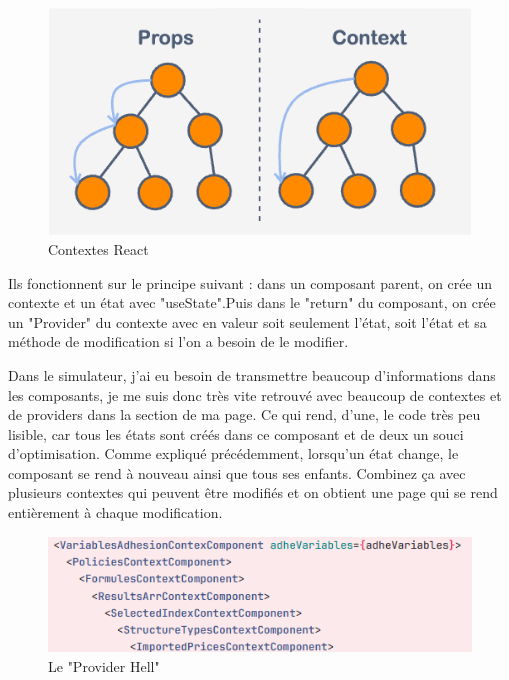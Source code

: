 \documentclass[a4paper,12pt]{report}
\begin{document}
\begin{figure}[H]
    \centering
    \includegraphics[scale=0.4]{props+vs+context.png}
    \caption{Contextes React}
    \label{fig:context-react}
\end{figure}

Ils fonctionnent sur le principe suivant : dans un composant parent, on crée un contexte et un état avec "useState".Puis dans le "return" du composant, on crée un "Provider" du contexte avec en valeur soit seulement l'état, soit l'état et sa méthode de modification si l'on a besoin de le modifier.

Dans le simulateur, j'ai eu besoin de transmettre beaucoup d'informations dans les composants, je me suis donc très vite retrouvé avec beaucoup de contextes et de providers dans la section de ma page. Ce qui rend, d'une, le code très peu lisible, car tous les états sont créés dans ce composant et de deux un souci d'optimisation. Comme expliqué précédemment, lorsqu'un état change, le composant se rend à nouveau ainsi que tous ses enfants. Combinez ça avec plusieurs contextes qui peuvent être modifiés et on obtient une page qui se rend entièrement à chaque modification.

\begin{figure}[H]
    \centering
    \includegraphics[scale=0.6]{providerHell.png}
    \caption{Le "Provider Hell"}
    \label{fig:provider-hell}
\end{figure}
\end{document}
